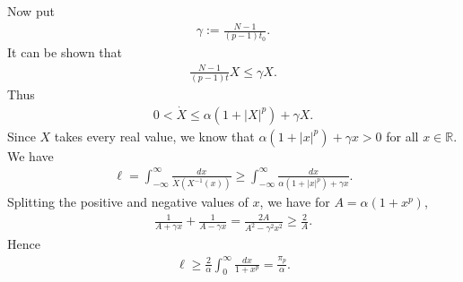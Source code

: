 \documentclass[11pt]{amsart}
\theoremstyle{definition}
\begin{document}
Now put 
\begin{align*}
    \gamma:=\frac{N-1}{(p-1)t_0}.
\end{align*}
It can be shown that
\begin{align*}
    \frac{N-1}{(p-1)t}X\leq \gamma X.
\end{align*}
Thus
\begin{align*}
    0<\dot{X}\leq \alpha(1+|X|^p)+\gamma X.
\end{align*}
Since $X$ takes every real value, we know that $\alpha(1+|x|^p)+\gamma x>0$ for all $x \in \mathbb{R}$. We have
\begin{align*}
    \ell=\int_{-\infty}^\infty\frac{dx}{\dot{X}(X^{-1}(x))}\geq \int_{-\infty}^{\infty}\frac{dx}{\alpha(1+|x|^p)+\gamma x}.
\end{align*}
Splitting the positive and negative values of $x$, we have for $A=\alpha(1+x^p)$, 
\begin{align*}
    \frac{1}{A+\gamma x}+\frac{1}{A-\gamma x}=\frac{2A}{A^2-\gamma^2 x^2}\geq \frac{2}{A}.
\end{align*}
Hence
\begin{align*}
    \ell \geq \frac{2}{\alpha}\int_0^\infty \frac{dx}{1+x^p}=\frac{\pi_p}{\alpha}.
\end{align*}



\end{document}
